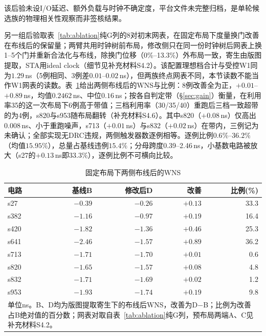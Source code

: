 \documentclass[twocolumn,10pt,fontset=windows]{ctexart}
\begin{document}
该后验未设I/O延迟、额外负载与时钟不确定度，平台文件未完整归档，是单轮候选族的物理相关性观察而非签核结果。

另一组后验取表~\ref{tab:ablation}纯G列的8对初末网表，在固定布局下度量换门改善在布线后的保留量；两臂共用时钟树前布局，修改侧只在同一份时钟树后网表上换1--5个门并重新合法化与布线，除换门位移（0\%--13.3\%）外布局一致，寄生由版图提取，STA用ideal clock（细节见补充材料S4.2）。该配置理想档合计与受控W1同为$1.29$\,ns（5例相同、3例差$0.01$--$0.02$\,ns），但两族终点网表不同，本节读数不能当作W1网表的读数。表~\ref{tab:phys_fixed}给出两侧布线后的WNS与比例：8例改善全为正，$+0.01$--$+0.89$\,ns，均值$0.2462$\,ns、中位$0.16$\,ns；按各自判定带（\S\ref{sec:gain}）衡量，在利用率35的这一次布局下6例高于带值；三档利用率（30/35/40）重跑后三档一致超带的为4例，s820与s953随布局翻转（补充材料S4.6）。其中s820（$+0.08$\,ns）仅高出0.008\,ns、小于重跑噪声，s713（$+0.01$\,ns）与s832（$+0.02$\,ns）在带内，三例记为未确认；全部实现无DRC违规，两侧触发器数逐例相等。逐例比例$0.6\%$--$36.2\%$（均值$15.95\%$），总量占基线违例$15.4\%$；分母跨度0.39--2.46\,ns，小基数电路被放大（s27的$+0.13$\,ns即$33.3\%$），逐例比例不可横向比较。

\begin{table}[htbp]
\centering\caption{固定布局下两侧布线后的WNS}\label{tab:phys_fixed}
\footnotesize\setlength{\tabcolsep}{3pt}
\begin{tabular}{lrrrr}
\toprule
\textbf{电路} & \textbf{基线B} & \textbf{修改后D} & \textbf{改善} & \textbf{比例(\%)}\\
\midrule
s27 & $-0.39$ & $-0.26$ & $+0.13$ & 33.3\\
s382 & $-1.16$ & $-0.97$ & $+0.19$ & 16.4\\
s420 & $-1.82$ & $-1.36$ & $+0.46$ & 25.3\\
s641 & $-2.46$ & $-1.57$ & $+0.89$ & 36.2\\
s713 & $-1.71$ & $-1.70$ & $+0.01$ & 0.6\\
s820 & $-1.65$ & $-1.57$ & $+0.08$ & 4.8\\
s832 & $-1.71$ & $-1.69$ & $+0.02$ & 1.2\\
s953 & $-1.93$ & $-1.74$ & $+0.19$ & 9.8\\
\bottomrule
\multicolumn{5}{p{0.92\columnwidth}}{\footnotesize 单位ns。B、D均为版图提取寄生下的布线后WNS，改善为D$-$B；比例为改善占B绝对值的百分数；网表对取自表~\ref{tab:ablation}纯G列，预布局两端A、C见补充材料S4.2。}\\
\end{tabular}\par
\end{table}
\end{document}
